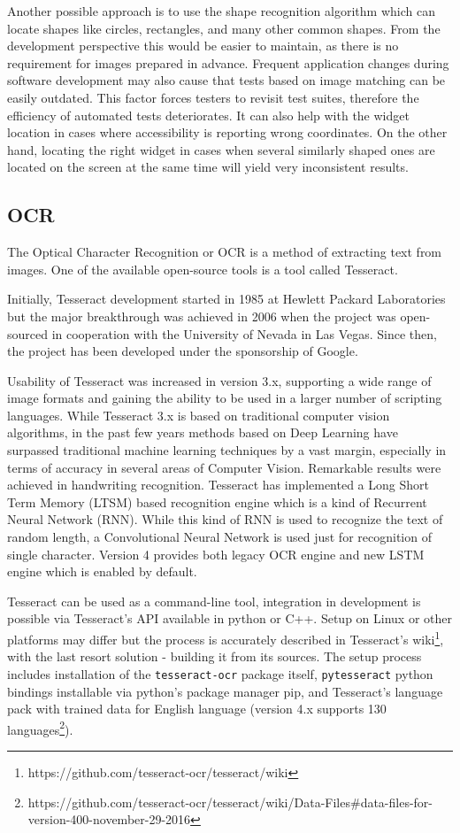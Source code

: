 Another possible approach is to use the shape recognition algorithm which can locate shapes like circles, rectangles, and many other common shapes. From the development perspective this would be easier to maintain, as there is no requirement for images prepared in advance. Frequent application changes during software development may also cause that tests based on image matching can be easily outdated. This factor forces testers to revisit test suites, therefore the efficiency of automated tests deteriorates. It can also help with the widget location in cases where accessibility is reporting wrong coordinates. On the other hand, locating the right widget in cases when several similarly shaped ones are located on the screen at the same time will yield very inconsistent results.

\subsection{OCR}\label{OCR_section}
The Optical Character Recognition or OCR is a method of extracting text from images. One of the available open-source tools is a tool called Tesseract.

Initially, Tesseract development started in 1985 at Hewlett Packard Laboratories but the major breakthrough was achieved in 2006 when the project was open-sourced in cooperation with the University of Nevada in Las Vegas. Since then, the project has been developed under the sponsorship of Google\cite{tesseract_history}.

Usability of Tesseract was increased in version 3.x, supporting a wide range of image formats and gaining the ability to be used in a larger number of scripting languages. While Tesseract 3.x is based on traditional computer vision algorithms, in the past few years methods based on Deep Learning have surpassed traditional machine learning techniques by a vast margin, especially in terms of accuracy in several areas of Computer Vision. Remarkable results were achieved in handwriting recognition. Tesseract has implemented a Long Short Term Memory (LTSM) based recognition engine which is a kind of Recurrent Neural Network (RNN). While this kind of RNN is used to recognize the text of random length, a Convolutional Neural Network is used just for recognition of single character. Version 4 provides both legacy OCR engine and new LSTM engine which is enabled by default.\cite{tesseract}

Tesseract can be used as a command-line tool, integration in development is possible via Tesseract's API available in python or C++. Setup on Linux or other platforms may differ but the process is accurately described in Tesseract's wiki\footnote{https://github.com/tesseract-ocr/tesseract/wiki}, with the last resort solution - building it from its sources.
The setup process includes installation of the \texttt{tesseract-ocr} package itself, \texttt{pytesseract} python bindings installable via python's package manager pip, and Tesseract's language pack with trained data for English language (version 4.x supports 130 languages\footnote{https://github.com/tesseract-ocr/tesseract/wiki/Data-Files\#data-files-for-version-400-november-29-2016}). 

